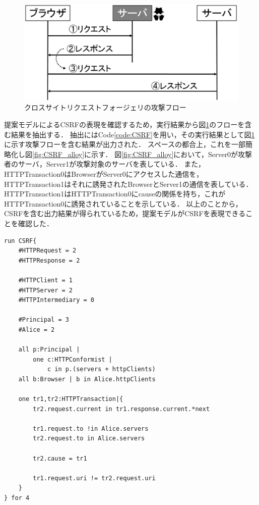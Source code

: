 \documentclass[12pt,a4paper]{jbook}
\begin{document}
\begin{figure}[htb]
\centering
\includegraphics[width=400pt]{./fig/CSRF_flow.eps}
\caption{クロスサイトリクエストフォージェリの攻撃フロー}
\label{fig:CSRF_flow}
\end{figure}

提案モデルによるCSRFの表現を確認するため，実行結果から図\ref{fig:CSRF_flow}のフローを含む結果を抽出する．
抽出にはCode\ref{code:CSRF}を用い，その実行結果として図\ref{fig:CSRF_flow}に示す攻撃フローを含む結果が出力された．
スペースの都合上，これを一部簡略化し図\ref{fig:CSRF_alloy}に示す．
図\ref{fig:CSRF_alloy}において，Server0が攻撃者のサーバ，Server1が攻撃対象のサーバを表している．
また，HTTPTransaction0はBrowserがServer0にアクセスした通信を，HTTPTransaction1はそれに誘発されたBrowserとServer1の通信を表している．
HTTPTransaction1はHTTPTransaction0にcauseの関係を持ち，これがHTTPTransaction0に誘発されていることを示している．
以上のことから，CSRFを含む出力結果が得られているため，提案モデルがCSRFを表現できることを確認した．

\begin{lstlisting}[caption=CSRF攻撃の表現, label=code:CSRF]
run CSRF{
	#HTTPRequest = 2
	#HTTPResponse = 2

	#HTTPClient = 1
	#HTTPServer = 2
	#HTTPIntermediary = 0

	#Principal = 3
	#Alice = 2

	all p:Principal |
		one c:HTTPConformist |
			c in p.(servers + httpClients)
	all b:Browser | b in Alice.httpClients

	one tr1,tr2:HTTPTransaction|{
		tr2.request.current in tr1.response.current.*next

		tr1.request.to !in Alice.servers
		tr2.request.to in Alice.servers

		tr2.cause = tr1

		tr1.request.uri != tr2.request.uri
	}
} for 4
\end{lstlisting}
\end{document}

